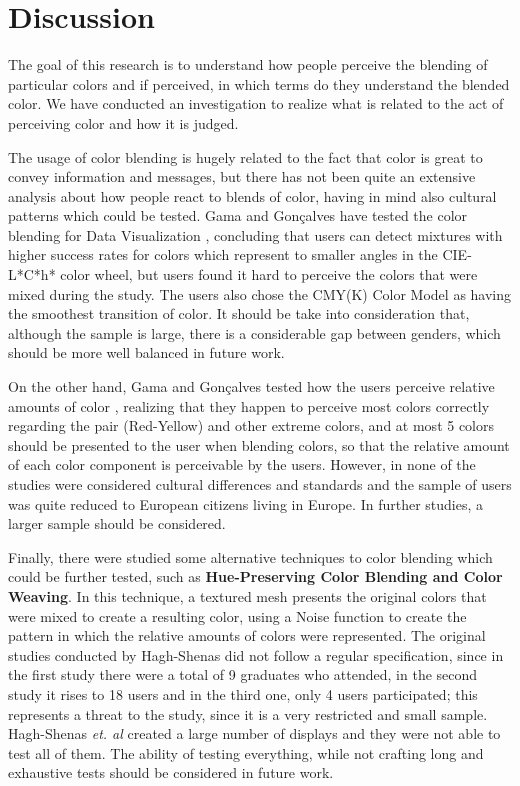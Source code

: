 \documentclass{report}
\begin{document}
\section{Discussion}
\label{discussion}
The goal of this research is to understand how people perceive the blending of particular colors and if perceived,
in which terms do they understand the blended color. We have conducted an investigation to realize what is related to
the act of perceiving color and how it is judged.  \par
The usage of color blending is hugely related to the fact that color is great to convey information and messages,
but there has not been quite an extensive analysis about how people react to blends of color, having in mind also
cultural patterns which could be tested. Gama and Gonçalves have tested the color blending for Data Visualization \cite{Gama20141},
concluding that users can detect mixtures with higher success rates for colors which represent to smaller angles
in the CIE-L*C*h* color wheel, but users found it hard to perceive the colors that were mixed during the study.
The users also chose the CMY(K) Color Model as having the smoothest transition of color. It should be take into
consideration that, although the sample is large, there is a considerable gap between genders, which should be
more well balanced in future work. \par
On the other hand, Gama and Gonçalves tested how the users perceive relative amounts of color \cite{Gama20142}, realizing that they happen to perceive most
colors correctly regarding the pair (Red-Yellow) and other extreme colors, and at most 5 colors should be presented
to the user when blending colors, so that the relative amount of each color component is perceivable by the users.
However, in none of the studies were considered cultural differences and standards and the sample of users was
quite reduced to European citizens living in Europe. In further studies, a larger sample should be
considered. \par
Finally, there were studied some alternative techniques to color blending which could be further tested, such
as \textbf{Hue-Preserving Color Blending and Color Weaving}. In this technique, a textured mesh presents the original
colors that were mixed to create a resulting color, using a Noise function to create the pattern in which the
relative amounts of colors were represented. The original studies conducted by Hagh-Shenas \cite{Hagh-Shenas2007} did not follow a
regular specification,
since in the first study there were a total of 9 graduates who attended, in the second study it rises to 18
users and in the third one, only 4 users participated; this represents a threat to the study, since it is a
very restricted and small sample. Hagh-Shenas \emph{et. al} created a large number of displays and they were not able
to test all of them. The ability of testing everything, while not crafting long and exhaustive tests should be
considered in future work.
\end{document}
